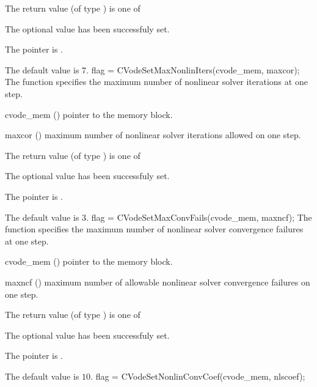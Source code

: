{
  The return value  (of type ) is one of
  \begin{args}
  \item[\Id{SUCCESS}] 
    The optional value has been successfuly set.
  \item[\Id{CVS\_NO\_MEM}]
    The  pointer is .
  \end{args}
}
{
  The default value is $7$.
}
{
flag = CVodeSetMaxNonlinIters(cvode\_mem, maxcor);
}
{
  The function  specifies the maximum
  number of nonlinear solver iterations at one step.
}
{
  \begin{args}
  \item[cvode\_mem] ()
    pointer to the {\cvodes} memory block.
  \item[maxcor] ()
    maximum number of nonlinear solver iterations allowed on one step.
  \end{args}
}
{
  The return value  (of type ) is one of
  \begin{args}
  \item[\Id{SUCCESS}] 
    The optional value has been successfuly set.
  \item[\Id{CVS\_NO\_MEM}]
    The  pointer is .
  \end{args}
}
{
  The default value is $3$.
}
{
flag = CVodeSetMaxConvFails(cvode\_mem, maxncf);
}
{
  The function  specifies the
  maximum number of nonlinear solver convergence failures at one step.
}
{
  \begin{args}
  \item[cvode\_mem] ()
    pointer to the {\cvodes} memory block.
  \item[maxncf] ()
    maximum number of allowable nonlinear solver convergence failures
    on one step.
  \end{args}
}
{
  The return value  (of type ) is one of
  \begin{args}
  \item[\Id{SUCCESS}] 
    The optional value has been successfuly set.
  \item[\Id{CVS\_NO\_MEM}]
    The  pointer is .
  \end{args}
}
{
  The default value is $10$.
}
{
flag = CVodeSetNonlinConvCoef(cvode\_mem, nlscoef);
}
